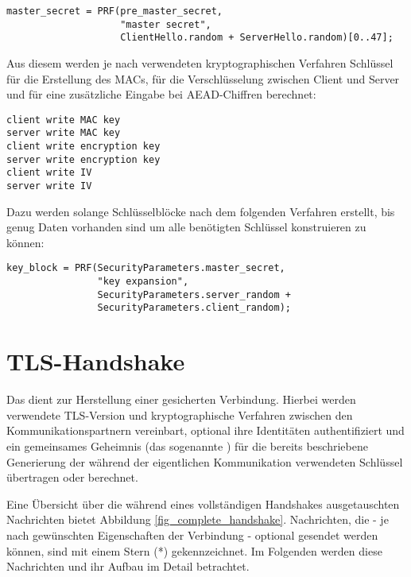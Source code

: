 \begin{lstlisting}
master_secret = PRF(pre_master_secret, 
					"master secret",
					ClientHello.random + ServerHello.random)[0..47];
\end{lstlisting}

Aus diesem \mastersecret{} werden je nach verwendeten kryptographischen Verfahren Schlüssel für die Erstellung des MACs, für die Verschlüsselung zwischen Client und Server und für eine zusätzliche Eingabe bei AEAD-Chiffren berechnet:
\begin{lstlisting}
client write MAC key
server write MAC key
client write encryption key
server write encryption key
client write IV
server write IV
\end{lstlisting}

Dazu werden solange Schlüsselblöcke nach dem folgenden Verfahren erstellt, bis genug Daten vorhanden sind um alle benötigten Schlüssel konstruieren zu können: 

\begin{lstlisting}
key_block = PRF(SecurityParameters.master_secret,
                "key expansion",
                SecurityParameters.server_random +
                SecurityParameters.client_random);
\end{lstlisting}


\section{TLS-Handshake}

\label{sec_tls_handshake}

Das \handshakeprotocol{} dient zur Herstellung einer gesicherten Verbindung. Hierbei werden verwendete TLS-Version und kryptographische Verfahren zwischen den Kommunikationspartnern vereinbart, optional ihre Identitäten authentifiziert und ein gemeinsames Geheimnis (das sogenannte \premastersecret{}) für die bereits beschriebene Generierung der während der eigentlichen Kommunikation verwendeten Schlüssel übertragen oder berechnet. 

Eine Übersicht über die während eines vollständigen Handshakes ausgetauschten Nachrichten bietet Abbildung \ref{fig_complete_handshake}. Nachrichten, die - je nach gewünschten Eigenschaften der Verbindung - optional gesendet werden können, sind mit einem Stern (*) gekennzeichnet. Im Folgenden werden diese Nachrichten und ihr Aufbau im Detail betrachtet.


